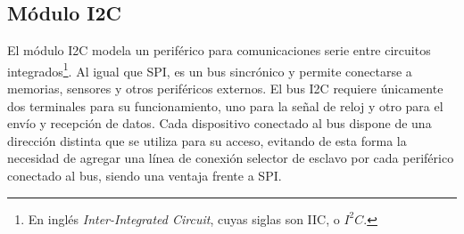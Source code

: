 \subsection{Módulo I2C}

El módulo I2C modela un periférico para comunicaciones serie entre circuitos integrados\footnote{En inglés \emph{Inter-Integrated Circuit}, cuyas siglas son IIC, o $I^{2}C$.}. Al igual que SPI, es un bus sincrónico y permite conectarse a memorias, sensores y otros periféricos externos. El bus I2C requiere únicamente dos terminales para su funcionamiento, uno para la señal de reloj y otro para el envío y recepción de datos. Cada dispositivo conectado al bus dispone de una dirección distinta que se utiliza para su acceso, evitando de esta forma la necesidad de agregar una línea de conexión selector de esclavo por cada periférico conectado al bus, siendo una ventaja frente a SPI.






%
%
%
%
%


